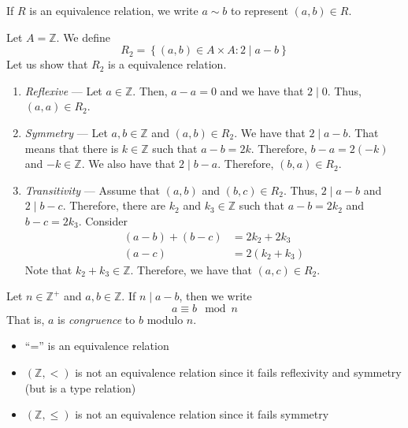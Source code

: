 \begin{remark}
    If \(R\) is an equivalence relation, we write \(a \sim b\) to represent \((a, b) \in R\).
\end{remark}

\begin{nexample}
    Let \(A = \mathbb{Z}\). We define
    \[
        R_2 = \left\{(a, b) \in A \times A : 2 \mid a-b\right\}
    \]
    Let us show that \(R_2\) is a equivalence relation.
    \begin{enumerate}
        \item \textit{Reflexive} --- Let \(a \in \mathbb{Z}\). Then, \(a - a = 0\) and we have that \(2 \mid 0\). Thus, \((a, a) \in R_2\).
        \item \textit{Symmetry} --- Let \(a, b \in \mathbb{Z}\) and \((a, b) \in R_2\). We have that \(2 \mid a-b\). That means that there is \(k \in \mathbb{Z}\) such that \(a - b = 2k\). Therefore, \(b - a = 2(-k)\) and \(-k \in \mathbb{Z}\). We also have that \(2 \mid b-a\). Therefore, \((b, a) \in R_2\).
        \item \textit{Transitivity} --- Assume that \((a, b)\) and \((b, c) \in R_2\). Thus, \(2 \mid a-b\) and \(2 \mid b-c\). Therefore, there are \(k_2\) and \(k_3 \in \mathbb{Z}\) such that \(a-b = 2k_2\) and \(b-c = 2k_3\). Consider
            \[
            \begin{aligned}
                (a - b) + (b - c) &= 2k_2 + 2k_3 \\
                (a - c) &= 2(k_2 + k_3)
            \end{aligned}
            \]
            Note that \(k_2 + k_3 \in \mathbb{Z}\). Therefore, we have that \((a, c) \in R_2\).
    \end{enumerate}
\end{nexample}

\begin{definition}[Congruency]
    Let \(n \in \mathbb{Z}^+\) and \(a, b \in \mathbb{Z}\). If \(n \mid a-b\), then we write
    \[
        a \equiv b \mod n
    \]
    That is, \(a\) is \textit{congruence} to \(b\) modulo \(n\).
\end{definition}

\begin{nexample}
    \phantom{wow}

    \begin{itemize}
        \item ``='' is an equivalence relation
        \item \((\mathbb{Z}, <)\) is not an equivalence relation since it fails reflexivity and symmetry (but is a type relation)
        \item \((\mathbb{Z}, \leq)\) is not an equivalence relation since it fails symmetry
    \end{itemize}
\end{nexample}

